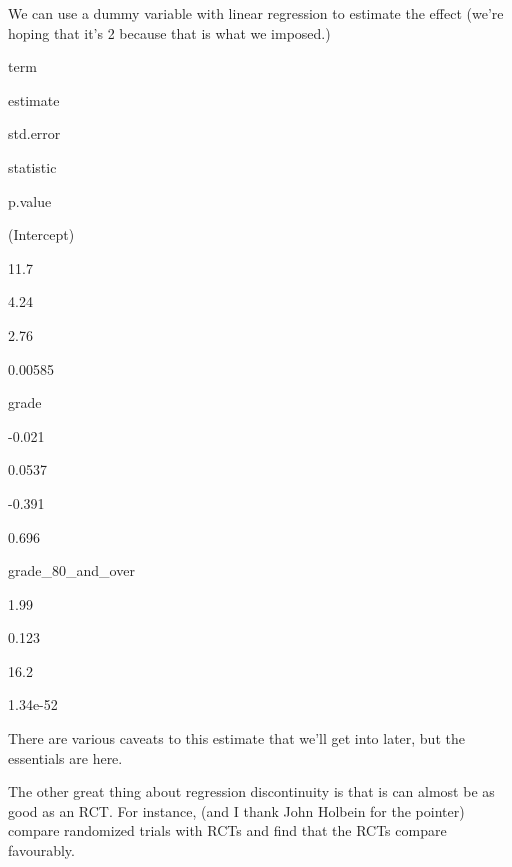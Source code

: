 \documentclass[
]{book}
\newenvironment{Shaded}{\begin{snugshade}}{\end{snugshade}}
\newcommand{\DataTypeTok}[1]{\textcolor[rgb]{0.13,0.29,0.53}{#1}}
\newcommand{\DecValTok}[1]{\textcolor[rgb]{0.00,0.00,0.81}{#1}}
\newcommand{\KeywordTok}[1]{\textcolor[rgb]{0.13,0.29,0.53}{\textbf{#1}}}
\newcommand{\NormalTok}[1]{#1}
\newcommand{\OperatorTok}[1]{\textcolor[rgb]{0.81,0.36,0.00}{\textbf{#1}}}
\newcommand{\StringTok}[1]{\textcolor[rgb]{0.31,0.60,0.02}{#1}}
\begin{document}
We can use a dummy variable with linear regression to estimate the effect (we're hoping that it's 2 because that is what we imposed.)

\begin{Shaded}
\end{Shaded}

\label{tab:unnamed-chunk-394}

term

estimate

std.error

statistic

p.value

(Intercept)

11.7~~

4.24~~

2.76~

0.00585~

grade

-0.021

0.0537

-0.391

0.696~~~

grade\_80\_and\_over

1.99~

0.123~

16.2~~

1.34e-52

There are various caveats to this estimate that we'll get into later, but the essentials are here.

The other great thing about regression discontinuity is that is can almost be as good as an RCT. For instance, (and I thank John Holbein for the pointer) \citet{bloombellreiman2020} compare randomized trials with RCTs and find that the RCTs compare favourably.
\end{document}
